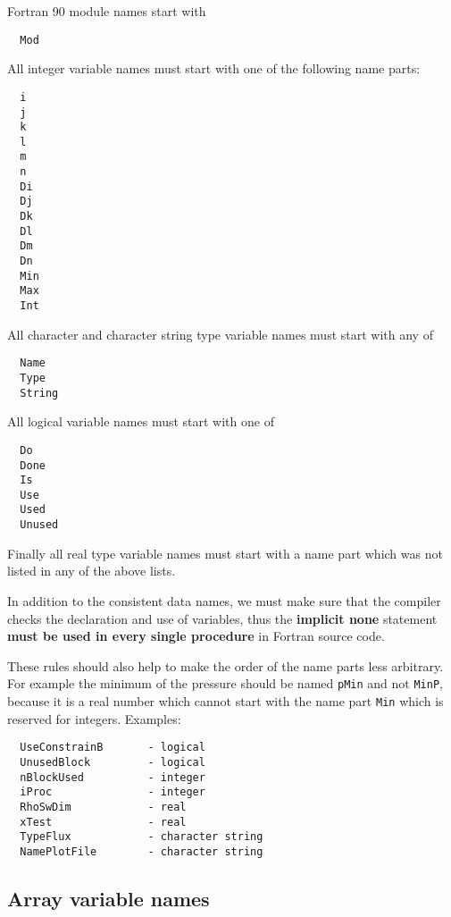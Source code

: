Fortran 90 module names start with 
\begin{verbatim}
  Mod
\end{verbatim}
All integer variable names must start with one of the following name parts:
\begin{verbatim}
  i
  j
  k
  l
  m
  n
  Di
  Dj
  Dk
  Dl
  Dm
  Dn
  Min
  Max
  Int
\end{verbatim}
All character and character string type variable names must start with
any of 
\begin{verbatim}
  Name
  Type
  String
\end{verbatim}
All logical variable names must start with one of
\begin{verbatim}
  Do
  Done
  Is
  Use
  Used
  Unused
\end{verbatim}
Finally all real type variable names must start with a name part 
which was not listed in any of the above lists.

In addition to the consistent data names, we must make sure that the compiler 
checks the declaration and use of variables, thus
the {\bf implicit none} statement {\bf must be
used in every single procedure} in Fortran source code. 

These rules should also help to make the order of the name parts
less arbitrary. For example the minimum of the pressure should
be named {\tt pMin} and not {\tt MinP}, because it is a real
number which cannot start with the name part {\tt Min} which 
is reserved for integers.
Examples:
\begin{verbatim}
  UseConstrainB       - logical
  UnusedBlock         - logical
  nBlockUsed          - integer
  iProc               - integer
  RhoSwDim            - real
  xTest               - real
  TypeFlux            - character string
  NamePlotFile        - character string
\end{verbatim}

\subsection{Array variable names}


